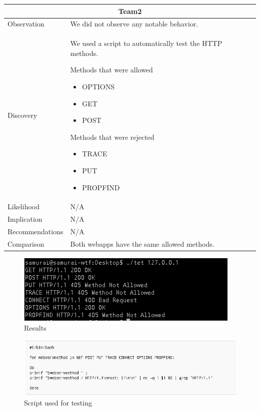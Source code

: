 \documentclass[headsepline,footsepline,footinclude=false,oneside,fontsize=11pt,paper=a4,listof=totoc,bibliography=totoc]{scrbook} %
\begin{document}
\begin{tabular}{ l|p{11cm}  }
	\hline
	\multicolumn{2}{c}{\textbf{Team2}} \\
	\hline
	Observation   &  We did not observe any notable behavior.  \\
	Discovery  &  We used a script to automatically test the HTTP methods.\

	Methods that were allowed\

	\begin{itemize} 
		\item OPTIONS
		\item GET
		\item POST 
	\end{itemize}

	Methods that were rejected\

	\begin{itemize}
		\item TRACE
		\item PUT
		\item PROPFIND
	\end{itemize} \\

	Likelihood & N/A \\
	Implication    & N/A \\
	Recommendations & N/A \\
	Comparison &  Both webapps have the same allowed methods.\\
	\hline
\end{tabular}

\begin{figure}
	\includegraphics[width=\linewidth]{logos/methods.jpg}
	\caption{Results}
	\label{fig:test}
\end{figure}

\begin{figure}
	\includegraphics[width=\linewidth]{script.png}
	\caption{Script used for testing}
	\label{fig:script}
\end{figure}
\end{document}
